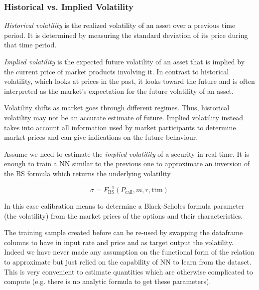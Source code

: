 \begin{attention}
\subsubsection{Historical vs. Implied Volatility}
\label{historical-vs.-implied-volatility}
	
\emph{Historical volatility} is the realized volatility of an asset over a previous time period. It is determined by measuring the standard deviation of its price during that time period.
	
\emph{Implied volatility} is the expected future volatility of an asset that is implied by the current price of market products involving it.
In contrast to historical volatility, which looks at prices in the past, it looks toward the future and is often interpreted as the market's expectation for the future volatility of an asset.
	
Volatility shifts as market goes through different regimes. Thus, historical volatility may not be an accurate estimate of future. Implied volatility instead takes into account all information used by market participants to determine market prices and can give indications on the future behaviour.
\end{attention}

Assume we need to estimate the \emph{implied volatility} of a security in real time. It is enough to train a NN similar to the previous one to approximate an inversion of the BS formula which returns the underlying volatility

\begin{equation} 
\sigma = F^{-1}_\textrm{BS}(P_\textrm{call}, m, r, \mathrm{ttm})
\end{equation}

In this case calibration means to determine a Black-Scholes formula parameter (the volatility) from the market prices of the options and their characteristics.

The training sample created before can be re-used by swapping the dataframe columns to have in input rate and price and as target output the volatility. 
Indeed we have never made any assumption on the functional form of the relation to approximate but just relied on the capability of NN to learn from the dataset.
This is very convenient to estimate quantities which are otherwise complicated to compute (e.g. there is no analytic formula to get these parameters).
 
